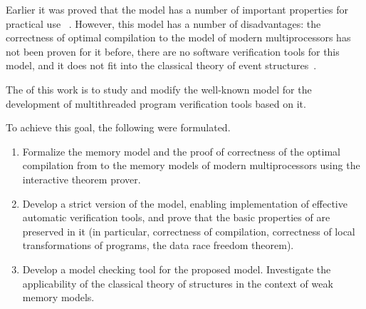 
Earlier it was proved that the \Wkm model has a number of important properties for practical use%
~\autocite{Chakraborty-Vafeiadis:POPL19}.
However, this model has a number of disadvantages:
the correctness of optimal compilation to the model of modern multiprocessors has not been proven for it before, there are no software verification tools for this model,
and it does not fit into the classical theory of event structures~\cite{Winskel:86}.


The {\aim} of this work is to study and modify the well-known \Wkm model for the development of multithreaded program verification tools based on it.


To achieve this goal, the following {\tasks} were formulated.
\begin{enumerate}[beginpenalty=10000] %
   \item
Formalize the \Wkm memory model and the proof of correctness of the optimal compilation from \Wkm to the memory models of modern multiprocessors using the \coq interactive theorem prover.
   \item
Develop a strict version of the \Wkm model,
enabling implementation of effective automatic verification tools, and prove that the basic properties of \Wkm are preserved in it (in particular, correctness of compilation, correctness of local transformations of programs,
the data race freedom theorem).
   \item
Develop a model checking tool for the proposed model.
Investigate the applicability of the classical theory of structures in the context of weak memory models.
\end{enumerate}

